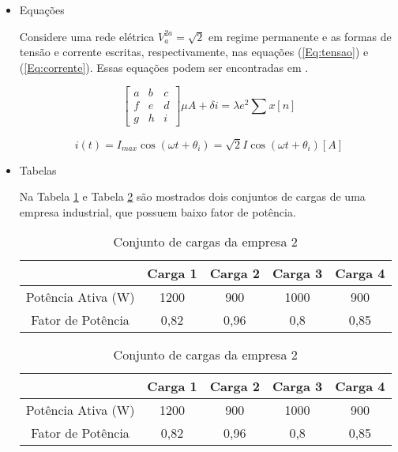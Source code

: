 \documentclass[a4paper,12pt,ruledheader,onecolumn,ceqn]{article}
\begin{document}
\begin{itemize}
\item Equações

Considere uma rede elétrica $V_a^{2a} = \sqrt{2}$ em regime permanente e as formas de tensão e corrente escritas, respectivamente, nas equações (\ref{Eq:tensao}) e (\ref{Eq:corrente}). Essas equações podem ser encontradas em \cite{nilsson}.


	\begin{equation}
		\left[ {\begin{array}{*{20}{c}}
				a&b&c\\
				f&e&d\\
				g&h&i
		\end{array}} \right]\mu A + \delta i = \lambda {e^2}\sum {x\left[ n \right]} 
		\label{Eq:tensao}
	\end{equation}


\begin{equation}
i(t)=I_{max} \cos(\omega t + \theta_i)=\sqrt{2} I \cos(\omega t + \theta_i) [A]
\label{Eq:corrente}
\end{equation}

\item Tabelas 

Na Tabela \ref{Tab:carga1} e Tabela \ref{Tab:carga2} são mostrados dois conjuntos de cargas de uma empresa industrial, que possuem baixo fator de potência.

\begin{table}[H]
	\centering 
	\caption{Conjunto de cargas da empresa 2}
	\begin{tabular}{ccccc}
		\hline
		& \textbf{Carga 1} & \textbf{Carga 2} & \textbf{Carga 3} & \textbf{Carga 4} \\ \hline
		Potência Ativa (W) & 1200 & 900 & 1000 & 900 \\ \hline
		Fator de Potência & 0,82 & 0,96 & 0,8 & 0,85 \\ \hline
	\end{tabular}
	\label{Tab:carga1}
\end{table}

\begin{table}[H]
\centering 
\caption{Conjunto de cargas da empresa 2}
\begin{tabular}{ccccc}
\hline
& \textbf{Carga 1} & \textbf{Carga 2} & \textbf{Carga 3} & \textbf{Carga 4} \\ \hline
Potência Ativa (W) & 1200 & 900 & 1000 & 900 \\ \hline
Fator de Potência & 0,82 & 0,96 & 0,8 & 0,85 \\ \hline
\end{tabular}
\label{Tab:carga2}
\end{table}


\end{itemize}
\end{document}
